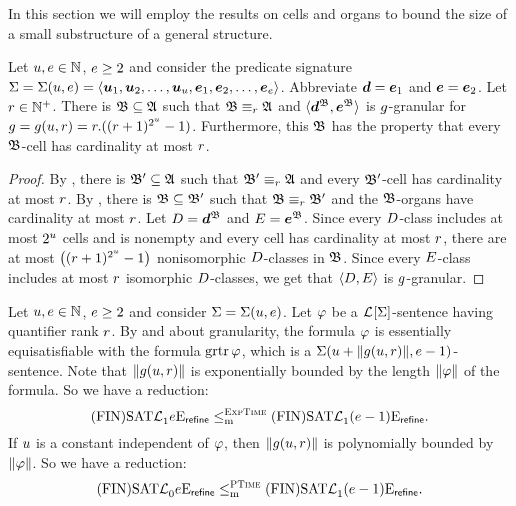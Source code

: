 
In this section we will employ the results on cells and organs to bound the size
of a small substructure of a general structure.

\begin{remark}\label{rem:monadic-granular}
Let $u, e \in \mathbb{N}$, $e \geq 2$ and consider the predicate
signature $\mathrm{\Sigma} = \mathrm{\Sigma}(u,e) =
\left\langle \bm{u}_{1},\bm{u}_{2},\dots,\bm{u}_{u},\bm{e}_{1},\bm{e}_{2},\dots,\bm{e}_{e} \right\rangle$.
Abbreviate $\bm{d} = \bm{e}_{1}$ and $\bm{e} = \bm{e}_{2}$.
Let $r \in \mathbb{N}^{+}$.
There is $\mathfrak{B} \subseteq \mathfrak{A}$ such that
$\mathfrak{B} \equiv_{r} \mathfrak{A}$ and $\langle \bm{d}^{\mathfrak{B}}, \bm{e}^{\mathfrak{B}} \rangle$ is
$g$-granular for $g = g(u,r) = r.((r+1)^{2^u}-1)$.
Furthermore, this $\mathfrak{B}$ has the property that every $\mathfrak{B}$-cell has
cardinality at most $r$.
\end{remark}
\begin{proof}
By , there is $\mathfrak{B'} \subseteq \mathfrak{A}$ such that
$\mathfrak{B'} \equiv_{r} \mathfrak{A}$ and every $\mathfrak{B'}$-cell has cardinality at most $r$.
By , there is $\mathfrak{B} \subseteq \mathfrak{B'}$ such that
$\mathfrak{B} \equiv_{r} \mathfrak{B'}$ and the $\mathfrak{B}$-organs have cardinality at most $r$.
Let $D = \bm{d}^{\mathfrak{B}}$ and $E = \bm{e}^{\mathfrak{B}}$.
Since every $D$-class includes at most $2^u$ cells and is
nonempty and every cell has cardinality at most $r$,
there are at most $\left((r+1)^{2^u}-1\right)$ nonisomorphic
$D$-classes in $\mathfrak{B}$.
Since every $E$-class includes at most $r$ isomorphic $D$-classes,
we get that $\left\langle D, E \right\rangle$ is $g$-granular.
\end{proof}
\begin{corollary}\label{cor:monadic-phi}
Let $u, e \in \mathbb{N}$, $e \geq 2$ and consider
$\mathrm{\Sigma} = \mathrm{\Sigma}(u,e)$.
Let $\varphi$ be a $\mathcal{L}^{{}}[\mathrm{\Sigma}]$-sentence having quantifier rank $r$.
By  and  about
granularity, the formula $\varphi$ is essentially equisatisfiable with the
formula $\operatorname{grtr}\varphi$, which is a
$\mathrm{\Sigma}(u + \|g(u,r)\|,e - 1)$-sentence.
Note that $\|g(u,r)\|$ is exponentially bounded by the length
$\|\varphi\|$ of the formula. So we have a reduction:
\[
  \mathrm{(FIN)SAT}\mathcal{L}^{{}}_{1}{e}\mathrm{E}_{\mathsf{refine}} \leq_{\mathrm{m}}^{\text{\normalfont{\scshape ExpTime}}}
  \mathrm{(FIN)SAT}\mathcal{L}^{{}}_{1}{(e-1)}\mathrm{E}_{\mathsf{refine}}.
\]
If $u$ is a constant independent of $\varphi$, then $\|g(u,r)\|$ is
polynomially bounded by $\|\varphi\|$. So we have a reduction:
\[
  \mathrm{(FIN)SAT}\mathcal{L}^{{}}_{0}{e}\mathrm{E}_{\mathsf{refine}} \leq_{\mathrm{m}}^{\text{\normalfont{\scshape PTime}}}
  \mathrm{(FIN)SAT}\mathcal{L}^{{}}_{1}{(e-1)}\mathrm{E}_{\mathsf{refine}}.
\]
\end{corollary}

